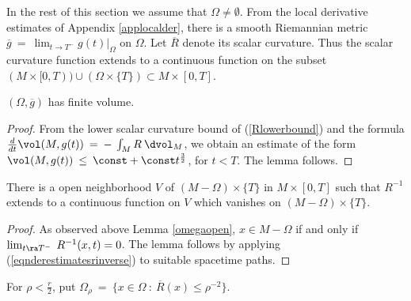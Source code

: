 In the rest of this section we assume that $\Omega \neq \emptyset$.
From the local derivative estimates of Appendix \ref{applocalder}, there is a smooth
Riemannian metric $\overline{g} \: =\: \lim_{t \rightarrow T^-} g(t) \Big|_\Omega$
on $\Omega$. Let $\overline{R}$ denote its scalar curvature.
Thus
the scalar curvature function extends to a continuous function on
the subset $(M\times [0,T))\cup (\Omega\times\{T\})\subset M\times [0,T]$.

\begin{lemma}
  \label{lem:kl-structure-at-first-singularity-time-volume-lemma}
 \label{volumeomega}
$(\Omega, \overline{g})$ has finite volume.
\end{lemma}
\begin{proof}
From the lower scalar curvature bound of (\ref{Rlowerbound}) and the formula
$\frac{d}{dt} \vol(M, g(t)) \: = \: - \: \int_M R \: \dvol_M$,
we obtain an estimate of the form
$\vol(M, g(t)) \: \le \: \const + \const t^{\frac32}$, for
$t < T$.
The lemma follows.
\end{proof}

\begin{lemma}
  \label{lem:kl-structure-at-first-singularity-time-existence-structure-at-first-singularity-time}

\label{lemrinverseextends}
There is a open neighborhood $V$ of $(M-\Omega)\times\{T\}$
in $M\times [0,T]$ such that $R^{-1}$  extends to a
continuous function on $V$ which vanishes on $(M-\Omega)\times\{T\}$.
\end{lemma}
\begin{proof}
As observed above Lemma \ref{omegaopen}, $x\in M-\Omega$ if and only if
$\lim_{t\ra T^-}\;R^{-1}(x,t)=0$. The lemma follows by applying
(\ref{eqnderestimatesrinverse}) to suitable spacetime paths.
\end{proof}


\begin{definition}
  \label{def:kl-structure-at-first-singularity-time-curvature-sublevel-regular-set}

For
$\rho < \frac{r}{2}$,
put $\Omega_\rho \: = \: \{x \in \Omega \: : \:
\overline{R}(x) \le \rho^{-2} \}$.
\end{definition}

